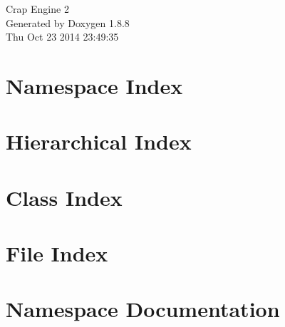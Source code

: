 \documentclass[twoside]{book}
\newcommand{\+}{\discretionary{\mbox{\scriptsize$\hookleftarrow$}}{}{}}
\newcommand{\clearemptydoublepage}{%
  \newpage{\pagestyle{empty}\cleardoublepage}%
}
\begin{document}
\hypersetup{pageanchor=false,
             bookmarks=true,
             bookmarksnumbered=true,
             pdfencoding=unicode
            }
\begin{titlepage}
\vspace*{7cm}
\begin{center}%
{\Large Crap Engine 2 }\\
\vspace*{1cm}
{\large Generated by Doxygen 1.8.8}\\
\vspace*{0.5cm}
{\small Thu Oct 23 2014 23:49:35}\\
\end{center}
\end{titlepage}
\clearemptydoublepage
\tableofcontents
\clearemptydoublepage
{}
\hypersetup{pageanchor=true}

\chapter{Namespace Index}

\chapter{Hierarchical Index}

\chapter{Class Index}

\chapter{File Index}

\chapter{Namespace Documentation}







\end{document}
